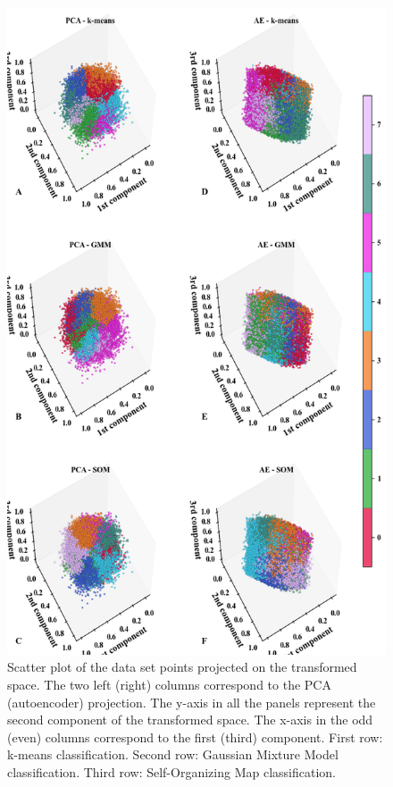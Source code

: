 \documentclass[utf8]{frontiersSCNS} %
\begin{document}
\begin{figure}[h!]
	\begin{center}
		\includegraphics[width=16cm]{Amaya/clustering}%
	\end{center}
	\caption{Scatter plot of the data set points projected on the transformed space. The two left (right) columns correspond to the PCA (autoencoder) projection. The y-axis in all the panels represent the second component of the transformed space. The x-axis in the odd (even) columns correspond to the first (third) component. First row: k-means classification. Second row: Gaussian Mixture Model classification. Third row: Self-Organizing Map classification.}\label{fig:clustering}
\end{figure}
\end{document}
